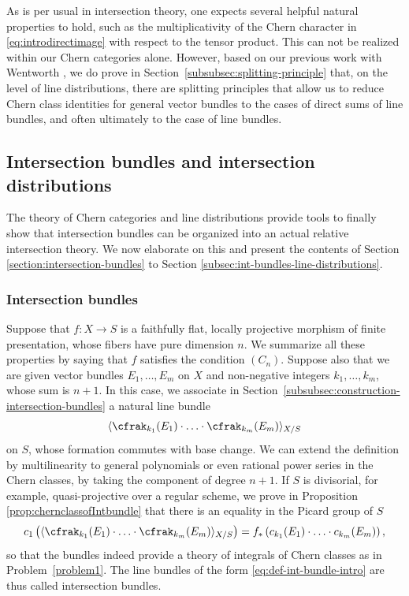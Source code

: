 As is per usual in intersection theory, one expects several helpful natural properties to hold, such as the multiplicativity of the Chern character in \eqref{eq:introdirectimage} with respect to the tensor product. This can not be realized within our Chern categories alone. However, based on our previous work with Wentworth \cite{Eriksson-Freixas-Wentworth}, we do prove in Section~\ref{subsubsec:splitting-principle} that, on the level of line distributions, there are splitting principles that allow us to reduce Chern class identities for general vector bundles to the cases of direct sums of line bundles, and often ultimately to the case of line bundles.

\subsection{Intersection bundles and intersection distributions}
The theory of Chern categories and line distributions provide tools to finally show that intersection bundles can be organized into an actual relative intersection theory. We now elaborate on this and present the contents of Section \ref{section:intersection-bundles} to Section \ref{subsec:int-bundles-line-distributions}.

\subsubsection*{Intersection bundles} Suppose that $f: X \to S$ is a faithfully flat, locally projective morphism of finite presentation, whose fibers have pure dimension $n$. We summarize all these properties by saying that $f$ satisfies the condition $(C_{n})$. Suppose also that we are given vector bundles $E_1, \ldots, E_m$ on $X$ and non-negative integers $k_1, \ldots, k_m$, whose sum is $n+1$. In this case, we associate in Section~\ref{subsubsec:construction-intersection-bundles} a natural line bundle
\begin{equation}\label{eq:def-int-bundle-intro}
\langle \cfrak_{k_1}(E_1) \cdot \ldots \cdot \cfrak_{k_m}(E_m) \rangle_{X/S}
\end{equation}
on $S$, whose formation commutes with base change. We can extend the definition by multilinearity to general polynomials or even rational power series in the Chern classes, by taking the component of degree $n+1$. If $S$ is divisorial, for example, quasi-projective over a regular scheme, we prove in Proposition \ref{prop:chernclassofIntbundle} that there is an equality in the Picard group of $S$
\begin{equation}\label{eq:chern-classes-integral-intro}
c_1\left(\langle \cfrak_{k_1}(E_1) \cdot \ldots \cdot \cfrak_{k_m}(E_m) \rangle_{X/S}\right) = f_\ast \left( c_{k_1}(E_1) \cdot \ldots \cdot c_{k_m}(E_m) \right),
\end{equation}
so that the bundles indeed provide a theory of integrals of Chern classes as in Problem~\ref{problem1}. The line bundles of the form \eqref{eq:def-int-bundle-intro} are thus called intersection bundles.

